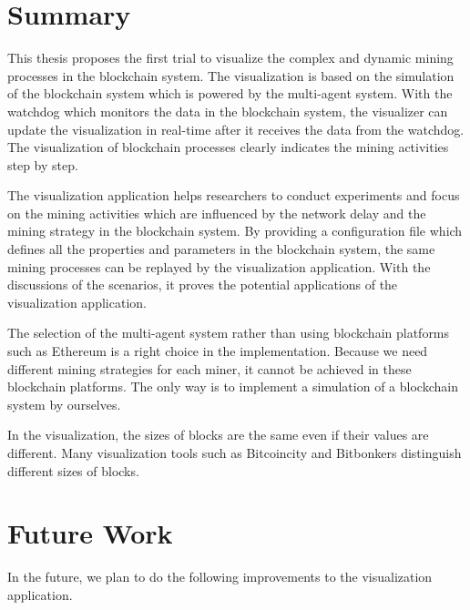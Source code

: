 \section{Summary}

This thesis proposes the first trial to visualize the complex and dynamic mining processes in the blockchain system. The visualization is based on the simulation of the blockchain system which is powered by the multi-agent system. With the watchdog which monitors the data in the blockchain system, the visualizer can update the visualization in real-time after it receives the data from the watchdog. The visualization of blockchain processes clearly indicates the mining activities step by step. 

The visualization application helps researchers to conduct experiments and focus on the mining activities which are influenced by the network delay and the mining strategy in the blockchain system. By providing a configuration file which defines all the properties and parameters in the blockchain system, the same mining processes can be replayed by the visualization application. With the discussions of the scenarios, it proves the potential applications of the visualization application.

The selection of the multi-agent system rather than using blockchain platforms such as Ethereum is a right choice in the implementation. Because we need different mining strategies for each miner, it cannot be achieved in these blockchain platforms. The only way is to implement a simulation of a blockchain system by ourselves.

In the visualization, the sizes of blocks are the same even if their values are different. Many visualization tools such as Bitcoincity and Bitbonkers distinguish different sizes of blocks. 


\section{Future Work}

In the future, we plan to do the following improvements to the visualization application.

